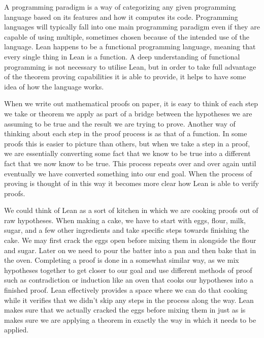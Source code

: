 \documentclass[
  letterpaper,
]{scrreprt}
\theoremstyle{remark}
\begin{document}
A programming paradigm is a way of categorizing any given programming
language based on its features and how it computes its code. Programming
languages will typically fall into one main programming paradigm even if
they are capable of using multiple, sometimes chosen because of the
intended use of the language. Lean happens to be a functional
programming language, meaning that every single thing in Lean is a
function. A deep understanding of functional programming is not
necessary to utilise Lean, but in order to take full advantage of the
theorem proving capabilities it is able to provide, it helps to have
some idea of how the language works.

When we write out mathematical proofs on paper, it is easy to think of
each step we take or theorem we apply as part of a bridge between the
hypotheses we are assuming to be true and the result we are trying to
prove. Another way of thinking about each step in the proof process is
as that of a function. In some proofs this is easier to picture than
others, but when we take a step in a proof, we are essentially
converting some fact that we know to be true into a different fact that
we now know to be true. This process repeats over and over again until
eventually we have converted something into our end goal. When the
process of proving is thought of in this way it becomes more clear how
Lean is able to verify proofs.

We could think of Lean as a sort of kitchen in which we are cooking
proofs out of raw hypotheses. When making a cake, we have to start with
eggs, flour, milk, sugar, and a few other ingredients and take specific
steps towards finishing the cake. We may first crack the eggs open
before mixing them in alongside the flour and sugar. Later on we need to
pour the batter into a pan and then bake that in the oven. Completing a
proof is done in a somewhat similar way, as we mix hypotheses together
to get closer to our goal and use different methods of proof such as
contradiction or induction like an oven that cooks our hypotheses into a
finished proof. Lean effectively provides a space where we can do that
cooking while it verifies that we didn't skip any steps in the process
along the way. Lean makes sure that we actually cracked the eggs before
mixing them in just as is makes sure we are applying a theorem in
exactly the way in which it needs to be applied.
\end{document}
